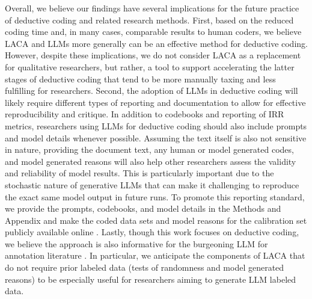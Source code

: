 \documentclass{article}
\begin{document}
Overall, we believe our findings have several implications for the future practice of deductive coding and related research methods.  First, based on the reduced coding time and, in many cases, comparable results to human coders, we believe LACA and LLMs more generally can be an effective method for deductive coding.
However, despite these implications, we do not consider LACA as a replacement for qualitative researchers, but rather, a tool to support accelerating the latter stages of deductive coding that tend to be more manually taxing and less fulfilling for researchers.  Second, the adoption of LLMs in deductive coding will likely require different types of reporting and documentation to allow for effective reproducibility and critique.  In addition to codebooks and reporting of IRR metrics, researchers using LLMs for deductive coding should also include prompts and model details whenever possible.  Assuming the text itself is also not sensitive in nature, providing the document text, any human or model generated codes, and model generated reasons will also help other researchers assess the validity and reliability of model results.  This is particularly important due to the stochastic nature of generative LLMs that can make it challenging to reproduce the exact same model output in future runs.  To promote this reporting standard, we provide the prompts, codebooks, and model details in the Methods and Appendix and make the coded data sets and model reasons for the calibration set publicly available online \cite{chew_llm-assisted_nodate}.  Lastly, though this work focuses on deductive coding, we believe the approach is also informative for the burgeoning LLM for annotation literature \cite{ding_is_2022, gilardi_chatgpt_2023, tornberg_chatgpt-4_2023, zhu_can_2023}.  In particular, we anticipate the components of LACA that do not require prior labeled data (tests of randomness and model generated reasons) to be especially useful for researchers aiming to generate LLM labeled data.
\end{document}
